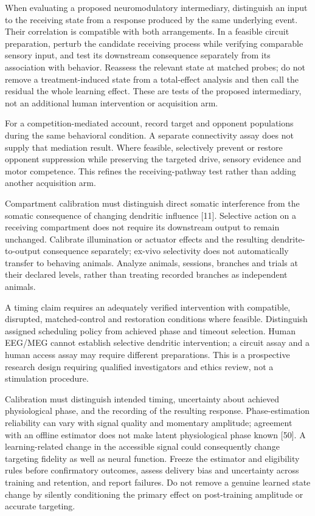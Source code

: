 \documentclass[
  american,
  11pt,
  letterpaper,
]{article}
\begin{document}
When evaluating a proposed neuromodulatory intermediary, distinguish an input to the receiving state from a response produced by the same underlying event. Their correlation is compatible with both arrangements. In a feasible circuit preparation, perturb the candidate receiving process while verifying comparable sensory input, and test its downstream consequence separately from its association with behavior. Reassess the relevant state at matched probes; do not remove a treatment-induced state from a total-effect analysis and then call the residual the whole learning effect. These are tests of the proposed intermediary, not an additional human intervention or acquisition arm.

For a competition-mediated account, record target and opponent populations during the same behavioral condition. A separate connectivity assay does not supply that mediation result. Where feasible, selectively prevent or restore opponent suppression while preserving the targeted drive, sensory evidence and motor competence. This refines the receiving-pathway test rather than adding another acquisition arm.

Compartment calibration must distinguish direct somatic interference from the somatic consequence of changing dendritic influence {[}11{]}. Selective action on a receiving compartment does not require its downstream output to remain unchanged. Calibrate illumination or actuator effects and the resulting dendrite-to-output consequence separately; ex-vivo selectivity does not automatically transfer to behaving animals. Analyze animals, sessions, branches and trials at their declared levels, rather than treating recorded branches as independent animals.

A timing claim requires an adequately verified intervention with compatible, disrupted, matched-control and restoration conditions where feasible. Distinguish assigned scheduling policy from achieved phase and timeout selection. Human EEG/MEG cannot establish selective dendritic intervention; a circuit assay and a human access assay may require different preparations. This is a prospective research design requiring qualified investigators and ethics review, not a stimulation procedure.

Calibration must distinguish intended timing, uncertainty about achieved physiological phase, and the recording of the resulting response. Phase-estimation reliability can vary with signal quality and momentary amplitude; agreement with an offline estimator does not make latent physiological phase known {[}50{]}. A learning-related change in the accessible signal could consequently change targeting fidelity as well as neural function. Freeze the estimator and eligibility rules before confirmatory outcomes, assess delivery bias and uncertainty across training and retention, and report failures. Do not remove a genuine learned state change by silently conditioning the primary effect on post-training amplitude or accurate targeting.
\end{document}
